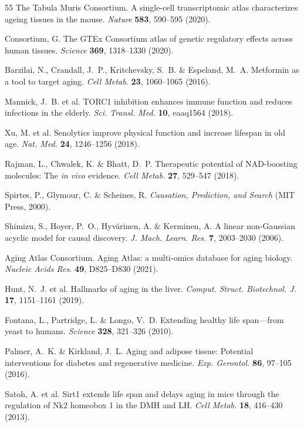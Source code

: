 \documentclass[11pt,a4paper]{article}
\begin{document}
\begin{thebibliography}{55}
The Tabula Muris Consortium.
A single-cell transcriptomic atlas characterizes ageing tissues in the mouse.
\textit{Nature} \textbf{583}, 590--595 (2020).

Consortium, G.
The GTEx Consortium atlas of genetic regulatory effects across human tissues.
\textit{Science} \textbf{369}, 1318--1330 (2020).

Barzilai, N., Crandall, J.~P., Kritchevsky, S.~B. \& Espeland, M.~A.
Metformin as a tool to target aging.
\textit{Cell Metab.} \textbf{23}, 1060--1065 (2016).

Mannick, J.~B. et al.
TORC1 inhibition enhances immune function and reduces infections in the elderly.
\textit{Sci. Transl. Med.} \textbf{10}, eaaq1564 (2018).

Xu, M. et al.
Senolytics improve physical function and increase lifespan in old age.
\textit{Nat. Med.} \textbf{24}, 1246--1256 (2018).

Rajman, L., Chwalek, K. \& Bhatt, D.~P.
Therapeutic potential of NAD-boosting molecules: The \textit{in vivo} evidence.
\textit{Cell Metab.} \textbf{27}, 529--547 (2018).

Spirtes, P., Glymour, C. \& Scheines, R.
\textit{Causation, Prediction, and Search} (MIT Press, 2000).

Shimizu, S., Hoyer, P.~O., Hyv\"{a}rinen, A. \& Kerminen, A.
A linear non-Gaussian acyclic model for causal discovery.
\textit{J. Mach. Learn. Res.} \textbf{7}, 2003--2030 (2006).

Aging Atlas Consortium.
Aging Atlas: a multi-omics database for aging biology.
\textit{Nucleic Acids Res.} \textbf{49}, D825--D830 (2021).

Hunt, N.~J. et al.
Hallmarks of aging in the liver.
\textit{Comput. Struct. Biotechnol. J.} \textbf{17}, 1151--1161 (2019).

Fontana, L., Partridge, L. \& Longo, V.~D.
Extending healthy life span---from yeast to humans.
\textit{Science} \textbf{328}, 321--326 (2010).

Palmer, A.~K. \& Kirkland, J.~L.
Aging and adipose tissue: Potential interventions for diabetes and regenerative medicine.
\textit{Exp. Gerontol.} \textbf{86}, 97--105 (2016).

Satoh, A. et al.
Sirt1 extends life span and delays aging in mice through the regulation of Nk2 homeobox 1 in the DMH and LH.
\textit{Cell Metab.} \textbf{18}, 416--430 (2013).


\end{thebibliography}
\end{document}
